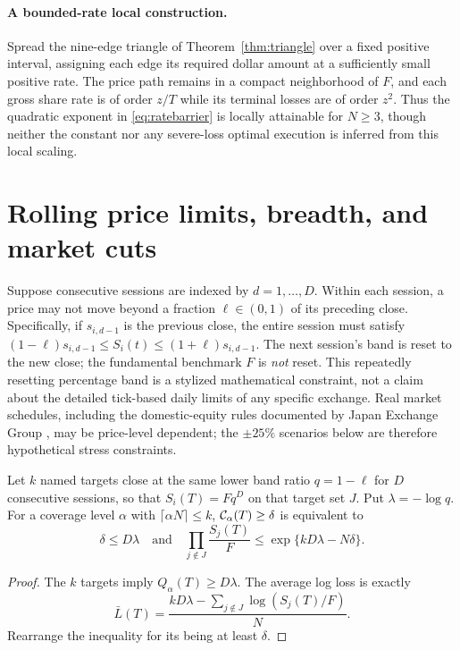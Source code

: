\documentclass[review,hidelinks,onefignum,onetabnum]{siamonline250211}%
\begin{document}
\paragraph{A bounded-rate local construction.}
Spread the nine-edge triangle of Theorem~\ref{thm:triangle}
over a fixed positive interval, assigning each edge its required
dollar amount at a sufficiently small positive rate. The price path
remains in a compact neighborhood of $F$, and each gross share
rate is of order $z/T$ while its terminal losses are of order
$z^2$. Thus the quadratic exponent in \eqref{eq:ratebarrier}
is locally attainable for $N\ge3$, though neither the constant nor
any severe-loss optimal execution is inferred from this local scaling.

\section{Rolling price limits, breadth, and market cuts}\label{sec:bands}
Suppose consecutive sessions are indexed by $d=1,\dots,D$.
Within each session, a price may not move beyond a fraction
$\ell\in(0,1)$ of its preceding close. Specifically, if
$s_{i,d-1}$ is the previous close, the entire session must satisfy
$(1-\ell)s_{i,d-1}\le S_i(t)\le(1+\ell)s_{i,d-1}$.
The next session's band is reset to the new close; the fundamental
benchmark $F$ is \emph{not} reset.
This repeatedly resetting percentage band is a stylized
mathematical constraint, not a claim about the detailed
tick-based daily limits of any specific exchange. Real
market schedules, including the domestic-equity rules
documented by Japan Exchange Group \citep{JPX2026},
may be price-level dependent; the $\pm25\%$ scenarios
below are therefore hypothetical stress constraints.

\begin{proposition}
\label{prop:breadthprod}
Let $k$ named targets close at the same lower band ratio
$q=1-\ell$ for $D$ consecutive sessions, so that
$S_i(T)=Fq^D$ on that target set $J$. Put $\lambda=-\log q$.
For a coverage level $\alpha$ with $\lceil\alpha N\rceil\le k$,
$\mathcal{C}_\alpha(T)\ge\delta$ is equivalent to
\begin{equation}\label{eq:product}
 \delta\le D\lambda\quad\text{and}\quad
 \prod_{j\notin J}\frac{S_j(T)}{F}
 \le \exp\{kD\lambda-N\delta\}.
\end{equation}
\end{proposition}
\begin{proof}
The $k$ targets imply $Q_\alpha(T)\ge D\lambda$.
The average log loss is exactly
\[
 \bar L(T)=\frac{kD\lambda-\sum_{j\notin J}\log(S_j(T)/F)}{N}.
\]
Rearrange the inequality for its being at least $\delta$.
\end{proof}
\end{document}
